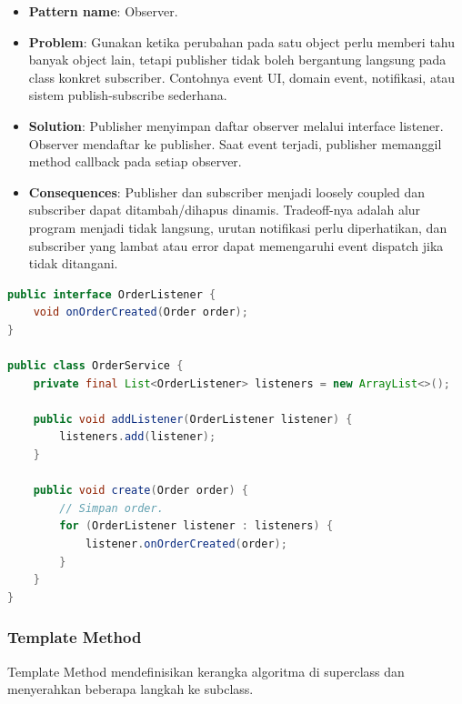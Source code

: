 \begin{itemize}
    \item \textbf{Pattern name}: Observer.
    \item \textbf{Problem}: Gunakan ketika perubahan pada satu object perlu memberi tahu banyak object lain, tetapi publisher tidak boleh bergantung langsung pada class konkret subscriber. Contohnya event UI, domain event, notifikasi, atau sistem publish-subscribe sederhana.
    \item \textbf{Solution}: Publisher menyimpan daftar observer melalui interface listener. Observer mendaftar ke publisher. Saat event terjadi, publisher memanggil method callback pada setiap observer.
    \item \textbf{Consequences}: Publisher dan subscriber menjadi loosely coupled dan subscriber dapat ditambah/dihapus dinamis. Tradeoff-nya adalah alur program menjadi tidak langsung, urutan notifikasi perlu diperhatikan, dan subscriber yang lambat atau error dapat memengaruhi event dispatch jika tidak ditangani.
\end{itemize}

\begin{lstlisting}[language=Java, caption={Observer Pattern sederhana}, label={lst:observer-pattern}]
public interface OrderListener {
    void onOrderCreated(Order order);
}

public class OrderService {
    private final List<OrderListener> listeners = new ArrayList<>();

    public void addListener(OrderListener listener) {
        listeners.add(listener);
    }

    public void create(Order order) {
        // Simpan order.
        for (OrderListener listener : listeners) {
            listener.onOrderCreated(order);
        }
    }
}
\end{lstlisting}

\subsubsection{Template Method}

\begin{jawab}
Template Method mendefinisikan kerangka algoritma di superclass dan menyerahkan beberapa langkah ke subclass.
\end{jawab}

